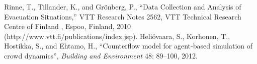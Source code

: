 \documentclass{article}
\begin{document}
\clearpage

\newpage

\renewcommand{\bibname}{References}
\begin{thebibliography}{99}
%
 Rinne, T., Tillander, K., and Grönberg, P., ``Data
  Collection and Analysis of Evacuation Situations,'' VTT Research
  Notes 2562, VTT Technical Research Centre of Finland , Espoo,
  Finland, 2010 (http://www.vtt.fi/publications/index.jsp).
%
 Heli\"ovaara, S., Korhonen, T., Hostikka, S.,
  and Ehtamo, H., ``Counterflow model for agent-based simulation of
  crowd dynamics'',  \emph{Building and Environment} 48: 89--100, 2012.
%
\end{thebibliography}
\end{document}
